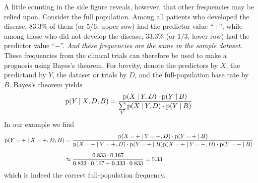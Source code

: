 \documentclass[utf8]{FrontiersinHarvard_mod} %
\newcommand*{\wrench}{{\fontencoding{U}\fontfamily{fontawesomethree}\selectfont\symbol{114}}}
\newcommand{\mynotew}[1]{{\color{notecolour}\wrench\ #1}}
\newcommand*{\mo}[1][=]{\mathord{\,#1\,}}
\newcommand*{\p}{\mathrm{p}}%
\renewcommand*{\|}[1][]{\nonscript\:#1\vert\nonscript\:\mathopen{}}
\begin{document}

A little counting in the side figure reveals, however, that other frequencies may be relied upon. Consider the full population. Among all patients who developed the disease, 83.3\% of them (or 5/6, upper row) had the predictor value \enquote{+}, while among those who did not develop the disease, 33.3\% (or 1/3, lower row) had the predictor value \enquote{$-$}. \emph{And these frequencies are the same in the sample dataset}. These frequencies from the clinical trials can therefore be used to make a prognosis using Bayes's theorem. For brevity, denote the predictors by $X$, the predictand by $Y$, the dataset or trials by $D$, and the full-population base rate by $B$. Bayes's theorem yields
\begin{equation}
  \label{eq:base-rate_correction}
  \p(Y \| X, D, B) =
  \frac{ \p(X \| Y, D) \cdot   \p(Y \| B)
}{\sum\limits_{Y} \p(X \| Y,  D) \cdot   \p(Y \| B)
}
\end{equation}
In our example we find
\begin{equation}
  \label{eq:base-rate_correction_example}
 \begin{split}
   \p(Y\mo\mathord{+} \| X\mo\mathord{+}, D, B)
   &=
  \frac{
    \p(X\mo\mathord{+} \| Y\mo\mathord{+}, D)
  \cdot   \p(Y\mo\mathord{+} \| B)
}{
  \p(X\mo\mathord{+} \| Y\mo\mathord{+}, D) 
  \cdot   \p(Y\mo\mathord{+} \| B)
    \p(X\mo\mathord{+} \| Y\mo\mathord{-}, D)
  \cdot   \p(Y\mo\mathord{-} \| B)
} \\[2\jot]
&\approx
  \frac{ 0.833 \cdot 0.167}{0.833 \cdot 0.167 + 0.333 \cdot 0.833}
  = 0.33
  \end{split}
\end{equation}
which is indeed the correct full-population frequency.
\end{document}
